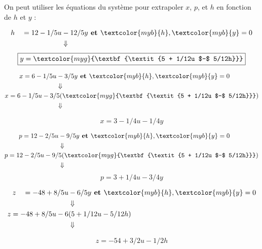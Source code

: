 \documentclass{report}
\begin{document}
\begin{multicols*}{3}
On peut utiliser les équations du système pour extrapoler 
$x$, $p$, et $h$ en fonction de $h$ et $y$ :


\begin{align*}
    h \quad = 12 - 1/5u &-12/5y
    \textbf{ et } \textcolor{myb}{h}, \textcolor{myb}{y} = 0 
    \\
                 &\Downarrow
\end{align*}
      \[%
    \boxed{y = \textcolor{myg}{\textbf{\textit{5 + 1/12u $-$ 5/12h}}} }
      \]%


\begin{align*}
    x = 6 - 1/5u &-3/5y 
    \textbf{ et } \textcolor{myb}{h}, \textcolor{myb}{y} = 0 
    \\
      &\Downarrow
    \\ 
    x = 6 - 1/5u -3/&5(\textcolor{myg}{\textbf{\textit{5 + 1/12u $-$ 5/12h}}}) 
    \\
                    &\Downarrow
\end{align*}

\vspace{-1em}
      \[%
          \boxed{x = 3 -1/4u -1/4y}
      \]%

\begin{align*}
    p = 12 - 2/5u &-9/5y 
    \textbf{ et } \textcolor{myb}{h}, \textcolor{myb}{y} = 0 
    \\
      &\Downarrow
    \\ 
    p = 12 - 2/5u -9/&5(\textcolor{myg}{\textbf{\textit{5 + 1/12u $-$ 5/12h}}}) 
    \\
                    &\Downarrow
\end{align*}
\vspace{-1em}
      \[%
          \boxed{p = 3 + 1/4u -3/4y}
      \]%


\begin{align*}
    z \quad = -48 +8/5u &- 6/5y
    \textbf{ et } \textcolor{myb}{h}, \textcolor{myb}{y} = 0 
    \\
                      &\Downarrow \\
    z = -48 +8/5u -6&(5 +1/12u -5/12h)
    \\
                    &\Downarrow
\end{align*}

\vspace{-1.25em}
      \[%
    \boxed{z = -54 +3/2u -1/2h}
      \]%


\end{multicols*}
\end{document}
